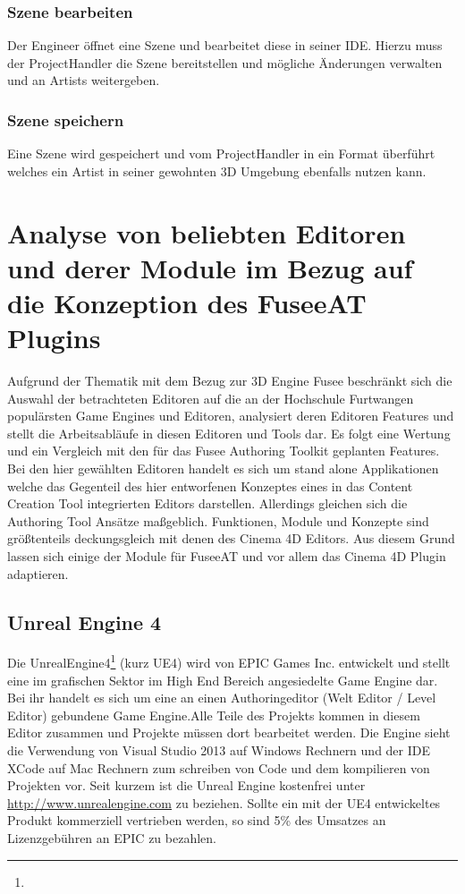 \documentclass[pagesize, paper=a4, fontsize=12pt, titlepage=true, headings=small, headnosepline, abstractoff, liststotoc, nochapterprefix, plainheadsepline, twoside]{scrreprt}
\begin{document}
\subsubsection{Szene bearbeiten}
Der Engineer öffnet eine Szene und bearbeitet diese in seiner IDE. Hierzu muss der ProjectHandler die Szene bereitstellen und mögliche Änderungen verwalten und an Artists weitergeben.

\subsubsection{Szene speichern}
Eine Szene wird gespeichert und vom ProjectHandler in ein Format überführt welches ein Artist in seiner gewohnten 3D Umgebung ebenfalls nutzen kann.

\section{Analyse von beliebten Editoren und derer Module im Bezug auf die Konzeption des FuseeAT Plugins}
Aufgrund der Thematik mit dem Bezug zur 3D Engine Fusee beschränkt sich die Auswahl der betrachteten Editoren auf die an der Hochschule Furtwangen populärsten Game Engines und Editoren, analysiert deren Editoren Features und stellt die Arbeitsabläufe in diesen Editoren und Tools dar. Es folgt eine Wertung und ein Vergleich mit den für das Fusee Authoring Toolkit geplanten Features. Bei den hier gewählten Editoren handelt es sich um stand alone Applikationen welche das Gegenteil des hier entworfenen Konzeptes eines in das Content Creation Tool integrierten Editors darstellen. Allerdings gleichen sich die Authoring Tool Ansätze maßgeblich. Funktionen, Module und Konzepte sind größtenteils deckungsgleich mit denen des Cinema 4D Editors. Aus diesem Grund lassen sich einige der Module für FuseeAT und vor allem das Cinema 4D Plugin adaptieren.

\subsection{Unreal Engine 4}
Die UnrealEngine4\footnote{} (kurz UE4) wird von EPIC Games Inc. entwickelt und stellt eine im grafischen Sektor im High End Bereich angesiedelte Game Engine dar. Bei ihr handelt es sich um eine an einen Authoringeditor (Welt Editor / Level Editor) gebundene Game Engine.Alle Teile des Projekts kommen in diesem Editor zusammen und Projekte müssen dort bearbeitet werden. Die Engine sieht die Verwendung von Visual Studio 2013 auf Windows Rechnern und der IDE XCode auf Mac Rechnern zum schreiben von Code und dem kompilieren von Projekten vor. Seit kurzem ist die Unreal Engine kostenfrei unter \url{http://www.unrealengine.com} zu beziehen. Sollte ein mit der UE4 entwickeltes Produkt kommerziell vertrieben werden, so sind 5\% des Umsatzes an Lizenzgebühren an EPIC zu bezahlen.
\end{document}
